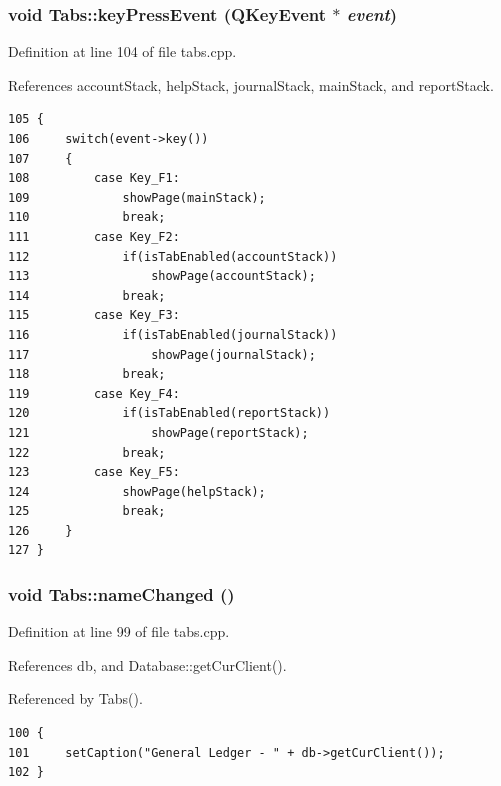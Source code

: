 \hypertarget{classTabs_d0}{
\subsubsection[keyPressEvent]{\setlength{\rightskip}{0pt plus 5cm}void Tabs::key\-Press\-Event (QKey\-Event $\ast$ {\em event})}}
\label{classTabs_d0}


Definition at line 104 of file tabs.cpp.

References account\-Stack, help\-Stack, journal\-Stack, main\-Stack, and report\-Stack.

\footnotesize\begin{verbatim}105 {
106     switch(event->key())
107     {
108         case Key_F1:
109             showPage(mainStack);
110             break;
111         case Key_F2:
112             if(isTabEnabled(accountStack))
113                 showPage(accountStack);
114             break;
115         case Key_F3:
116             if(isTabEnabled(journalStack))
117                 showPage(journalStack);
118             break;
119         case Key_F4:
120             if(isTabEnabled(reportStack))
121                 showPage(reportStack);
122             break;
123         case Key_F5:
124             showPage(helpStack);
125             break;
126     }
127 }
\end{verbatim}\normalsize 


\hypertarget{classTabs_k2}{
\subsubsection[nameChanged]{\setlength{\rightskip}{0pt plus 5cm}void Tabs::name\-Changed ()}}
\label{classTabs_k2}


Definition at line 99 of file tabs.cpp.

References db, and Database::get\-Cur\-Client().

Referenced by Tabs().

\footnotesize\begin{verbatim}100 {
101     setCaption("General Ledger - " + db->getCurClient());
102 }
\end{verbatim}\normalsize 



